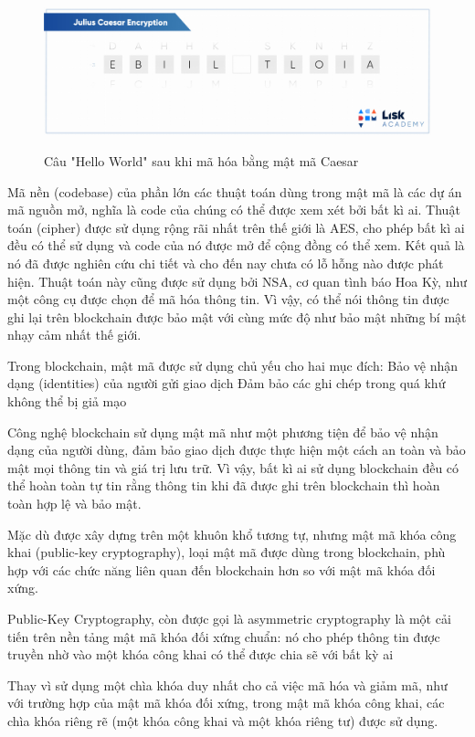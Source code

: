 \begin{figure}[ht]
	\centering
	\includegraphics[width=0.9\linewidth]{image/caesarAfter}\label{fig:CaesarAfter}
	\caption{Câu "Hello World" sau khi mã hóa bằng mật mã Caesar}
\end{figure}


Mã nền (codebase) của phần lớn các thuật toán dùng trong mật mã là các dự án mã nguồn mở, nghĩa là code của chúng có thể được xem xét bởi bất kì ai. Thuật toán (cipher) được sử dụng rộng rãi nhất trên thế giới là AES, cho phép bất kì ai đều có thể sử dụng và code của nó được mở để cộng đồng có thể xem. Kết quả là nó đã được nghiên cứu chi tiết và cho đến nay chưa có lỗ hỗng nào được phát hiện.  Thuật toán này cũng được sử dụng bởi NSA, cơ quan tình báo Hoa Kỳ, như một công cụ được chọn để mã hóa thông tin. Vì vậy, có thể nói thông tin được ghi lại trên blockchain được bảo mật với cùng mức độ như bảo mật những bí mật nhạy cảm nhất thế giới. 

Trong blockchain, mật mã được sử dụng chủ yếu cho hai mục đích:
Bảo vệ nhận dạng (identities) của người gửi giao dịch
Đảm bảo các ghi chép trong quá khứ không thể bị giả mạo

Công nghệ blockchain sử dụng mật mã như một phương tiện để bảo vệ nhận dạng của người dùng, đảm bảo giao dịch được thực hiện một cách an toàn và bảo mật mọi thông tin và giá trị lưu trữ. Vì vậy, bất kì ai sử dụng blockchain đều có thể hoàn toàn tự tin rằng thông tin khi đã được ghi trên blockchain thì hoàn toàn hợp lệ và bảo mật.

Mặc dù được xây dựng trên một khuôn khổ tương tự, nhưng mật mã khóa công khai (public-key cryptography), loại mật mã được dùng trong blockchain, phù hợp với các chức năng liên quan đến blockchain hơn so với mật mã khóa đối xứng.

 Public-Key Cryptography, còn được gọi là asymmetric cryptography là một cải tiến trên nền tảng mật mã khóa đối xứng chuẩn: nó cho phép thông tin được truyền nhờ vào một khóa công khai có thể được chia sẽ với bất kỳ ai
 
 Thay vì sử dụng một chìa khóa duy nhất cho cả việc mã hóa và giảm mã, như với trường hợp của mật mã khóa đối xứng, trong mật mã khóa công khai, các chìa khóa riêng rẽ (một khóa công khai và một khóa riêng tư) được sử dụng.
 
